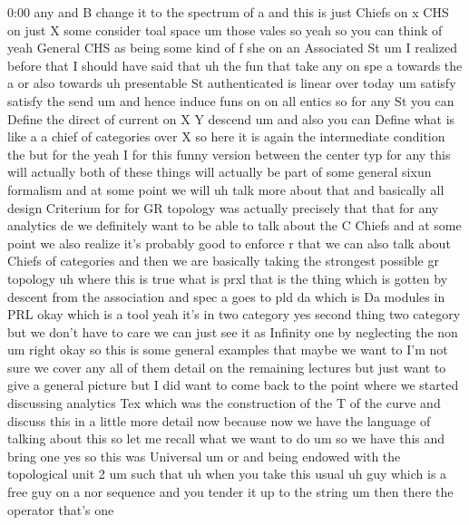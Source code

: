 \begin{unfinished}{0:00}
any  and  B  change  it  to  the  spectrum  of
a  and  this  is  just  Chiefs  on
x  CHS  on  just  X  some  consider  toal  space
um  those
vales  so  yeah  so  you  can  think
of  yeah  General  CHS  as  being  some  kind
of  f  she  on  an  Associated
St
um
I  realized  before  that  I  should  have
said  that
uh  the
fun  that  take
any  on  spe  a  towards  the
a  or  also
towards  uh  presentable  St  authenticated
is  linear  over  today
um  satisfy  satisfy  the
send
um  and  hence  induce
funs  on  on  all
entics  so  for  any  St  you  can  Define  the
direct  of  current  on  X  Y  descend
um  and  also  you  can  Define  what  is  like
a  a  chief  of  categories  over
X  so  here  it  is  again  the  intermediate
condition  the  but  for  the  yeah  I  for
this  funny  version
between  the  center
typ  for
any
this  will  actually  both  of  these  things
will  actually  be  part  of  some  general
sixun  formalism  and  at  some  point  we
will  uh  talk  more  about
that  and  basically  all
design  Criterium  for  for  GR  topology  was
actually  precisely  that  that  for  any
analytics  de  we  definitely  want  to  be
able  to  talk  about  the  C  Chiefs  and  at
some  point  we  also  realize  it's  probably
good  to  enforce  r  that  we  can  also  talk
about  Chiefs  of  categories  and  then  we
are  basically  taking  the  strongest
possible  gr  topology  uh  where  this  is
true
what  is
prxl  that  is  the  thing  which  is  gotten
by  descent  from  the  association  and  spec
a  goes  to  pld  da  which  is  Da  modules  in
PRL  okay  which  is  a  tool
yeah  it's  in  two
category  yes  second  thing  two  category
but  we  don't  have  to  care  we  can  just
see  it  as  Infinity  one  by  neglecting  the
non
um
right  okay  so  this  is  some  general
examples  that  maybe  we  want
to  I'm  not  sure  we  cover  any  all  of  them
detail  on  the  remaining  lectures  but
just  want  to  give  a  general  picture  but
I  did  want  to  come  back  to  the  point
where  we  started  discussing  analytics
Tex  which  was  the  construction  of  the  T
of  the
curve  and  discuss  this  in  a  little  more
detail  now  because  now  we  have  the
language  of  talking  about
this
so  let  me  recall  what  we  want  to
do  um  so  we  have  this  and
bring
one
yes
so  this  was
Universal  um
or  and  being  endowed  with  the
topological  unit
2  um  such
that  uh  when  you  take  this
usual  uh  guy  which  is  a  free  guy  on  a
nor
sequence  and  you  tender  it  up  to  the
string
um  then  there  the  operator  that's  one

\end{unfinished}

